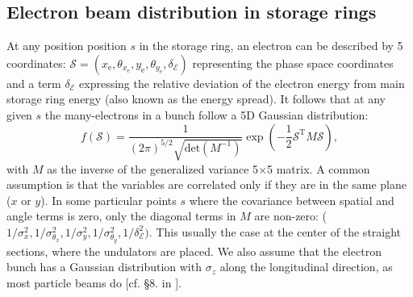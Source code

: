 \documentclass{iucr}              %
\newcommand{\todo}[1]{{\color{red}[TODO: "#1'']}}
\begin{document}
\subsection{Electron beam distribution in storage rings}
\label{sec:electronbeam}


At any position position $s$ in the storage ring, an electron can be described by 5 coordinates:
$\mathcal{S}= (x_\text{e},\theta_{x_\text{e}},y_\text{e},   \theta_{y_\text{e}},\delta_\mathcal{E})$ representing the phase space coordinates and a term $\delta_\mathcal{E}$ expressing the relative deviation of the electron energy from main storage ring energy (also known as the energy spread). It follows that at any given $s$ the many-electrons in a bunch follow a 5D Gaussian distribution:
\begin{equation}\label{eq:f-electrons}
f(\mathcal{S}) = \frac{1}{(2 \pi)^{5/2} \sqrt{\text{det}(M^{-1})}} \exp
        \left( -\frac{1}{2} \mathcal{S}^\text{T} M \mathcal{S} \right),
\end{equation}
with $M$ as the inverse of the generalized variance 5$\times$5 matrix. A common assumption is that the variables are correlated only if they are in the same plane ($x$ or $y$). In some particular points $s$ where the covariance between spatial and angle terms is zero, only the diagonal terms in $M$ are non-zero: ($1/\sigma_x^2,1/\sigma_{\theta_x}^2,1/\sigma_y^2,1/\sigma_{\theta_y}^2,1/\delta_\mathcal{E}^2)$. This usually the case at the center of the straight sections, where the undulators are placed.  We also assume that the electron bunch has a Gaussian distribution with $\sigma_z$ along the longitudinal direction, as most particle beams do [cf. \S8. in \cite{Wiedemann2015}].

 

\end{document}

